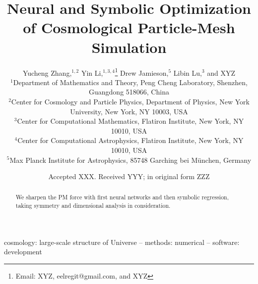 \documentclass[usenatbib]{mnras}
\title[Optimized Cosmological Simulation]
{Neural and Symbolic Optimization of Cosmological Particle-Mesh
Simulation}
\author[Zhang \& Li et al.]{
%
Yucheng Zhang,$^{1, 2}$
%
Yin Li,$^{1, 3, 4}$\thanks{Email: XYZ, eelregit@gmail.com, and XYZ}
%
Drew Jamieson,$^{5}$
%
Libin Lu,$^{3}$
%
and XYZ
%
\\$^1$Department of Mathematics and Theory, Peng Cheng Laboratory,
Shenzhen, Guangdong 518066, China
%
\\$^2$Center for Cosmology and Particle Physics, Department of Physics,
New York University, New York, NY 10003, USA
%
\\$^3$Center for Computational Mathematics, Flatiron Institute, New
York, NY 10010, USA
%
\\$^4$Center for Computational Astrophysics, Flatiron Institute, New
York, NY 10010, USA
%
\\$^5$Max Planck Institute for Astrophysics, 85748 Garching bei
M\"unchen, Germany
}
\date{Accepted XXX. Received YYY; in original form ZZZ}
\begin{document}
\label{firstpage}
\pagerange{\pageref{firstpage}--\pageref{lastpage}}
\maketitle



\begin{abstract}
We sharpen the PM force with first neural networks and then symbolic
regression, taking symmetry and dimensional analysis in consideration.
\end{abstract}

\begin{keywords}
cosmology: large-scale structure of Universe
-- methods: numerical
-- software: development
\end{keywords}
\end{document}
